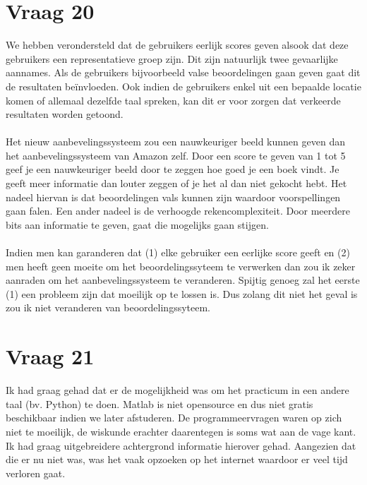 \documentclass[11pt,a4paper]{article}
\begin{document}
\section*{Vraag 20}
We hebben verondersteld dat de gebruikers eerlijk scores geven alsook dat deze gebruikers een representatieve groep zijn. Dit zijn natuurlijk twee gevaarlijke aannames. Als de gebruikers bijvoorbeeld valse beoordelingen gaan geven gaat dit de resultaten beïnvloeden. Ook indien de gebruikers enkel uit een bepaalde locatie komen of allemaal dezelfde taal spreken, kan dit er voor zorgen dat verkeerde resultaten worden getoond.
\\
\\
Het nieuw aanbevelingssysteem zou een nauwkeuriger beeld kunnen geven dan het aanbevelingssysteem van Amazon zelf. Door een score te geven van 1 tot 5 geef je een nauwkeuriger beeld door te zeggen hoe goed je een boek vindt. Je geeft meer informatie dan louter zeggen of je het al dan niet gekocht hebt. Het nadeel hiervan is dat beoordelingen vals kunnen zijn waardoor voorspellingen gaan falen. Een ander nadeel is de verhoogde rekencomplexiteit. Door meerdere bits aan informatie te geven, gaat die mogelijks gaan stijgen.
\\
\\
Indien men kan garanderen dat (1) elke gebruiker een eerlijke score geeft en (2) men heeft geen moeite om het beoordelingssyteem te verwerken dan zou ik zeker aanraden om het aanbevelingssysteem te veranderen.
Spijtig genoeg zal het eerste (1) een probleem zijn dat moeilijk op te lossen is. Dus zolang dit niet het geval is zou ik niet veranderen van beoordelingssyteem.
\section*{Vraag 21}
Ik had graag gehad dat er de mogelijkheid was om het practicum in een andere taal (bv. Python) te doen. Matlab is niet opensource en dus niet gratis beschikbaar indien we later afstuderen.
De programmeervragen waren op zich niet te moeilijk, de wiskunde erachter daarentegen is soms wat aan de vage kant. Ik had graag uitgebreidere achtergrond informatie hierover gehad.
Aangezien dat die er nu niet was, was het vaak opzoeken op het internet waardoor er veel tijd verloren gaat.
\end{document}
